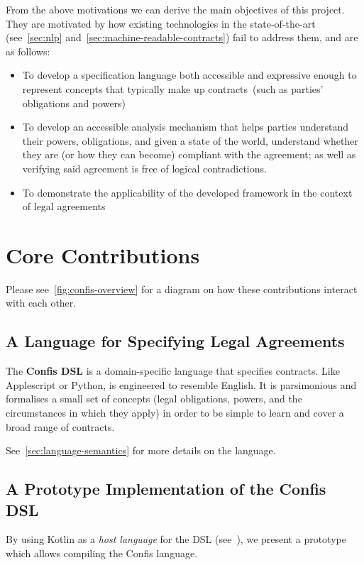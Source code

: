From the above motivations we can derive the main objectives of this project.
They are motivated by how existing technologies in the state-of-the-art (see~\autoref{sec:nlp} and~\autoref{sec:machine-readable-contracts}) fail to address them, and are as follows:
\begin{itemize}
    \item To develop a specification language both accessible and expressive enough to represent concepts that typically make up contracts~(such as parties' obligations and powers)

    \item To develop an accessible analysis mechanism that helps parties understand their powers, obligations, and given a state of the world, understand whether they are (or how they can become) compliant with the agreement;
    as well as verifying said agreement is free of logical contradictions.

    \item To demonstrate the applicability of the developed framework in the context of legal agreements
\end{itemize}


\section{Core Contributions}\label{sec:core-contributions}

Please see~\autoref{fig:confis-overview} for a diagram on how these contributions interact with each other.

\subsection{A Language for Specifying Legal Agreements}
The \textbf{Confis DSL} is a domain-specific language that specifies contracts.
Like Applescript or Python, is engineered to resemble English.
It is parsimonious and formalises a small set of concepts (legal obligations, powers, and the circumstances in which they apply) in order to be simple to learn and cover a broad range of contracts.

See~\autoref{sec:language-semantics} for more details on the language.

\subsection{A Prototype Implementation of the Confis DSL}
By using Kotlin as a \emph{host language} for the DSL (see~), we present a prototype which allows compiling the Confis language.

